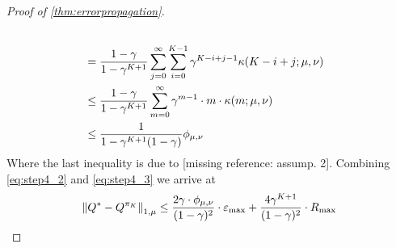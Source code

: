 \documentclass{article}
\theoremstyle{definition}
\begin{document}
\begin{proof}[Proof of \cref{thm:errorpropagation}]
\begin{align}
    \\ &= \frac{1-\gamma}{1-\gamma^{K+1}} \sum_{j=0}^\infty \sum_{i=0}^{K-1} 
    \gamma^{K-i+j-1} \kappa(K-i+j;\mu,\nu) \notag
    \\ &\leq \frac{1-\gamma}{1-\gamma^{K+1}} \sum_{m=0}^\infty
    \gamma^{m-1} \cdot m \cdot \kappa(m; \mu, \nu) \notag
    \\ &\leq \frac{1}{1-\gamma^{K+1}(1-\gamma)} \phi_{\mu,\nu}
    \label{eq:step4_3}
  \end{align}
  Where the last inequality is due to [missing reference: assump. 2].
  Combining \cref{eq:step4_2} and \cref{eq:step4_3} we arrive at
  \begin{equation}
    \norm{Q^* - Q^{\pi_K}}_{1,\mu} \leq
    \frac{2\gamma \cdot \phi_{\mu,\nu}}{(1-\gamma)^2} \cdot \varepsilon_{\max}
    + \frac{4\gamma^{K+1}}{(1-\gamma)^2} \cdot R_{\max}
  \end{equation}
\end{proof}
\end{document}
